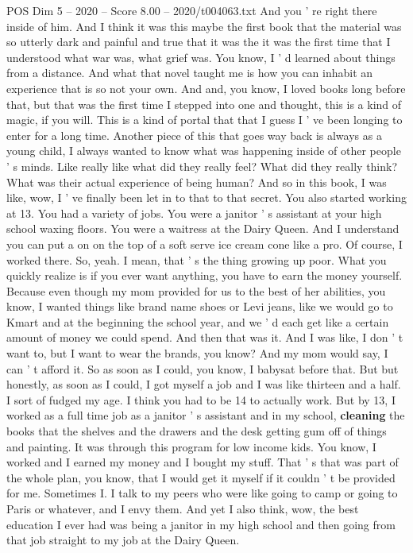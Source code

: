 \begin{textsample}{POS Dim 5 – 2020 – Score 8.00 – 2020/t004063.txt}
And you ' re right there inside of him.
And I think it was this maybe the first book that the material was so utterly dark and painful and true that it was the it was the first time that I understood what war was, what grief was.
You know, I ' d learned about things from a distance.
And what that novel taught me is how you can inhabit an experience that is so not your own.
And and, you know, I loved books long before that, but that was the first time I stepped into one and thought, this is a kind of magic, if you will.
This is a kind of portal that that I guess I ' ve been longing to enter for a long time.
Another piece of this that goes way back is always as a young child, I always wanted to know what was happening inside of other people ' s minds.
Like really like what did they really feel?
What did they really think?
What was their actual experience of being human?
And so in this book, I was like, wow, I ' ve finally been let in to that to that secret.
You also started working at 13.
You had a variety of jobs.
You were a janitor ' s assistant at your high school waxing floors.
You were a waitress at the Dairy Queen.
And I understand you can put a on on the top of a soft serve ice cream cone like a pro.
Of course, I worked there.
So, yeah.
I mean, that ' s the thing growing up poor.
What you quickly realize is if you ever want anything, you have to earn the money yourself.
Because even though my mom provided for us to the best of her abilities, you know, I wanted things like brand name shoes or Levi jeans, like we would go to Kmart and at the beginning the school year, and we ' d each get like a certain amount of money we could spend.
And then that was it.
And I was like, I don ' t want to, but I want to wear the brands, you know?
And my mom would say, I can ' t afford it.
So as soon as I could, you know, I babysat before that.
But but honestly, as soon as I could, I got myself a job and I was like thirteen and a half.
I sort of fudged my age.
I think you had to be 14 to actually work.
But by 13, I worked as a full time job as a janitor ' s assistant and in my school, \textbf{cleaning} the books that the shelves and the drawers and the desk getting gum off of things and painting.
It was through this program for low income kids.
You know, I worked and I earned my money and I bought my stuff.
That ' s that was part of the whole plan, you know, that I would get it myself if it couldn ' t be provided for me.
Sometimes I.
I talk to my peers who were like going to camp or going to Paris or whatever, and I envy them.
And yet I also think, wow, the best education I ever had was being a janitor in my high school and then going from that job straight to my job at the Dairy Queen.

\end{textsample}
